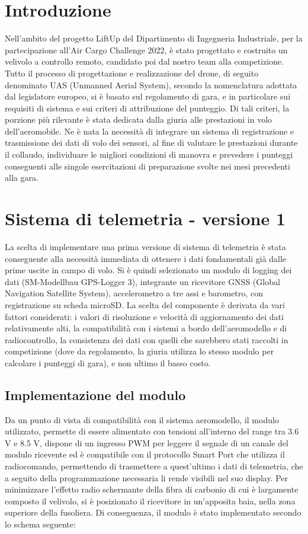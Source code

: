 \documentclass[12pt]{article}
\begin{document}
\section*{Introduzione}
Nell'ambito del progetto LiftUp del Dipartimento di Ingegneria Industriale, per la partecipazione all'Air Cargo Challenge 2022, è stato progettato e costruito un velivolo a controllo remoto, candidato poi dal nostro team alla competizione.
Tutto il processo di progettazione e realizzazione del drone, di seguito denominato UAS (Unmanned Aerial System), secondo la nomenclatura adottata dal legislatore europeo, si è basato sul regolamento di gara, e in particolare sui requisiti di sistema e sui criteri di attribuzione del punteggio. Di tali criteri, la porzione più rilevante è stata dedicata dalla giuria alle prestazioni in volo dell'aeromobile. Ne è nata la necessità di integrare un sistema di registrazione e trasmissione dei dati di volo dei sensori, al fine di valutare le prestazioni durante il collaudo, individuare le migliori condizioni di manovra e prevedere i punteggi conseguenti alle singole esercitazioni di preparazione svolte nei mesi precedenti alla gara.

\section*{Sistema di telemetria - versione 1}
La scelta di implementare una prima versione di sistema di telemetria è stata conseguente alla necessità immediata di ottenere i dati fondamentali già dalle prime uscite in campo di volo. Si è quindi selezionato un modulo di logging dei dati (SM-Modellbau GPS-Logger 3), integrante un ricevitore GNSS (Global Navigation Satellite System), accelerometro a tre assi e barometro, con registrazione su scheda microSD. La scelta del componente è derivata da vari fattori considerati: i valori di risoluzione e velocità di aggiornamento dei dati relativamente alti, la compatibilità con i sistemi a bordo dell'aeromodello e di radiocontrollo, la consistenza dei dati con quelli che sarebbero stati raccolti in competizione (dove da regolamento, la giuria utilizza lo stesso modulo per calcolare i punteggi di gara), e non ultimo il basso costo.

\subsection*{Implementazione del modulo}
Da un punto di vista di compatibilità con il sistema aeromodello, il modulo utilizzato, permette di essere alimentato con tensioni all'interno del range tra 3.6 V e 8.5 V, dispone di un ingresso PWM per leggere il segnale di un canale del modulo ricevente ed è compatibile con il protocollo Smart Port che utilizza il radiocomando, permettendo di trasmettere a quest'ultimo i dati di telemetria, che a seguito della programmazione necessaria li rende visibili nel suo display. Per minimizzare l'effetto radio schermante della fibra di carbonio di cui è largamente composto il velivolo, si è posizionato il ricevitore in un'apposita baia, nella zona superiore della fusoliera. Di conseguenza, il modulo è stato implementato secondo lo schema seguente:
\end{document}
